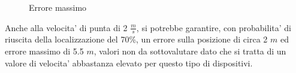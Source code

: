 \begin{figure}[H]
    \centering
    \hfill
    \caption{Errore massimo}
\end{figure}
Anche alla velocita' di punta di 2 $\frac{m}{s}$, si potrebbe garantire, con probabilita' di riuscita della localizzazione del 70\%, un errore sulla posizione di circa 2 $m$ ed errore massimo di 5.5 $m$, valori non da sottovalutare dato che si tratta di un valore di velocita' abbastanza elevato per questo tipo di dispositivi. 


